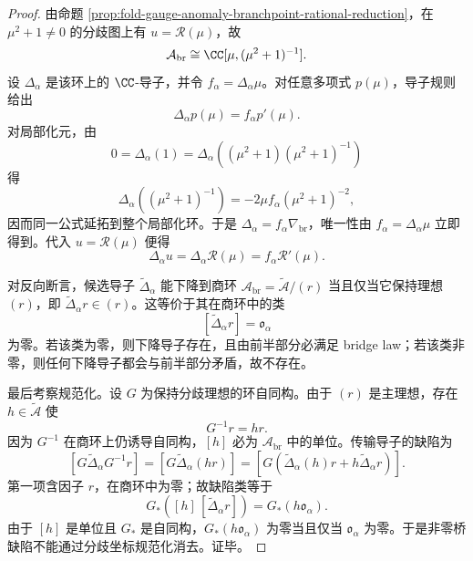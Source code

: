 \begin{proof}
由命题 \ref{prop:fold-gauge-anomaly-branchpoint-rational-reduction}，在 \(\mu^2+1\neq0\) 的分歧图上有 \(u=\mathcal R(\mu)\)，故
\[
\mathcal A_{\mathrm{br}}\cong \CC[\mu,(\mu^2+1)^{-1}].
\]
设 \(\Delta_\alpha\) 是该环上的 \(\CC\)-导子，并令 \(f_\alpha=\Delta_\alpha\mu\)。对任意多项式 \(p(\mu)\)，导子规则给出
\[
\Delta_\alpha p(\mu)=f_\alpha p'(\mu).
\]
对局部化元，由
\[
0=\Delta_\alpha(1) = \Delta_\alpha((\mu^2+1)(\mu^2+1)^{-1})
\]
得
\[
\Delta_\alpha((\mu^2+1)^{-1})=-2\mu f_\alpha(\mu^2+1)^{-2},
\]
因而同一公式延拓到整个局部化环。于是 \(\Delta_\alpha=f_\alpha\nabla_{\mathrm{br}}\)，唯一性由 \(f_\alpha=\Delta_\alpha\mu\) 立即得到。代入 \(u=\mathcal R(\mu)\) 便得
\[
\Delta_\alpha u=\Delta_\alpha\mathcal R(\mu)=f_\alpha\mathcal R'(\mu).
\]

对反向断言，候选导子 \(\widetilde\Delta_\alpha\) 能下降到商环 \(\mathcal A_{\mathrm{br}}=\widetilde{\mathcal A}/(r)\) 当且仅当它保持理想 \((r)\)，即 \(\widetilde\Delta_\alpha r\in(r)\)。这等价于其在商环中的类
\[
[\widetilde\Delta_\alpha r]=\mathfrak o_\alpha
\]
为零。若该类为零，则下降导子存在，且由前半部分必满足 bridge law；若该类非零，则任何下降导子都会与前半部分矛盾，故不存在。

最后考察规范化。设 \(G\) 为保持分歧理想的环自同构。由于 \((r)\) 是主理想，存在 \(h\in\widetilde{\mathcal A}\) 使
\[
G^{-1}r=hr.
\]
因为 \(G^{-1}\) 在商环上仍诱导自同构，\([h]\) 必为 \(\mathcal A_{\mathrm{br}}\) 中的单位。传输导子的缺陷为
\[
[G\widetilde\Delta_\alpha G^{-1}r]
=[G\widetilde\Delta_\alpha(hr)]
=[G(\widetilde\Delta_\alpha(h)r+h\widetilde\Delta_\alpha r)].
\]
第一项含因子 \(r\)，在商环中为零；故缺陷类等于
\[
G_\ast([h]\,[\widetilde\Delta_\alpha r])=G_\ast(h\mathfrak o_\alpha).
\]
由于 \([h]\) 是单位且 \(G_\ast\) 是自同构，\(G_\ast(h\mathfrak o_\alpha)\) 为零当且仅当 \(\mathfrak o_\alpha\) 为零。于是非零桥缺陷不能通过分歧坐标规范化消去。证毕。
\end{proof}

\endinput
